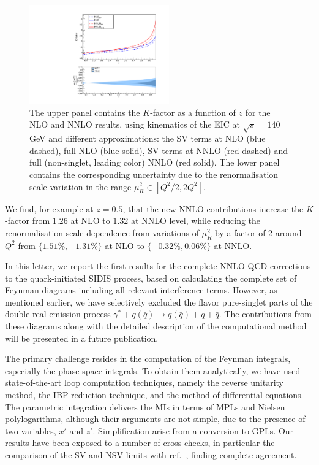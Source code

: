 \documentclass[%
 twocolumn,
 superscriptaddress,
 preprintnumbers,
 nofootinbib,
 amsmath,amssymb,
 aps,
 prl,
]{revtex4}
\begin{document}
\begin{figure}[!ht]
\includegraphics[width=0.538\textwidth,height=0.548\textwidth]
{EIC140GeV.pdf}
\caption{The upper panel contains the $K$-factor as a function of $z$ for the NLO and NNLO results, using kinematics of the EIC at $\sqrt{s}=140$ GeV and different approximations:
the SV terms at NLO (blue dashed), full NLO (blue solid), 
SV terms at NNLO (red dashed) and full (non-singlet, leading color) NNLO (red solid). 
The lower panel contains the corresponding uncertainty due to the renormalisation scale variation in the range $\mu_R^2 \in [Q^2/2,2Q^2]$.}\label{fig:1}
\end{figure}
We find, for example at $z=0.5$, that the new NNLO contributions increase the $K$-factor from $1.26$ at NLO to $1.32$ at NNLO level, while reducing the renormalisation 
scale dependence from variations of $\mu_R^2$ by a factor of 2 around $Q^2$  
from $\{1.51\%, -1.31\%\}$ at NLO to $\{-0.32\%, 0.06\%\}$ at NNLO.

In this letter, we report the first results for the complete NNLO QCD corrections to the quark-initiated SIDIS process, 
based on calculating the complete set of Feynman diagrams including all relevant interference terms.
However, as mentioned earlier, we have selectively excluded the flavor pure-singlet parts of the double real emission process $\gamma^* + q(\bar{q}) \rightarrow q(\bar{q}) + q + \bar{q}$.
The contributions from these diagrams along with the detailed 
description of the computational method will be presented in a future publication. 

The primary challenge resides in the computation of the Feynman integrals, especially 
the phase-space integrals. 
To obtain them analytically, we have used state-of-the-art loop computation techniques,
namely the reverse unitarity method, the IBP reduction technique, and the method of differential equations. 
The parametric integration delivers the MIs in terms of MPLs and Nielsen polylogarithms, 
although their arguments are not simple, due to the presence of two variables, $x'$ and $z'$.
Simplification arise from a conversion to GPLs.
Our results have been exposed to a number of cross-checks, in particular the comparison of the SV and NSV limits with ref.~\cite{Abele:2021nyo}, finding complete agreement.
\end{document}
